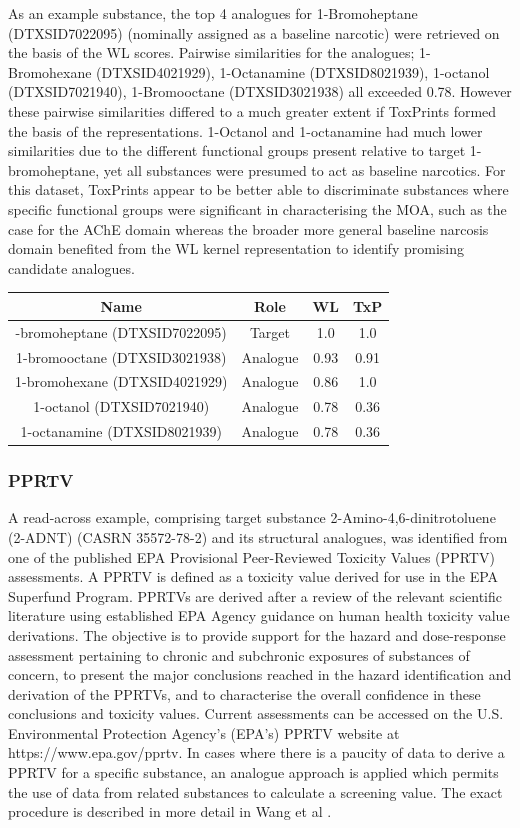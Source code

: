 \documentclass[
  super,
  preprint,
  3p]{elsarticle}
\begin{document}
As an example substance, the top 4 analogues for 1-Bromoheptane
(DTXSID7022095) (nominally assigned as a baseline narcotic) were
retrieved on the basis of the WL scores. Pairwise similarities for the
analogues; 1-Bromohexane (DTXSID4021929), 1-Octanamine (DTXSID8021939),
1-octanol (DTXSID7021940), 1-Bromooctane (DTXSID3021938) all exceeded
0.78. However these pairwise similarities differed to a much greater
extent if ToxPrints formed the basis of the representations. 1-Octanol
and 1-octanamine had much lower similarities due to the different
functional groups present relative to target 1-bromoheptane, yet all
substances were presumed to act as baseline narcotics. For this dataset,
ToxPrints appear to be better able to discriminate substances where
specific functional groups were significant in characterising the MOA,
such as the case for the AChE domain whereas the broader more general
baseline narcosis domain benefited from the WL kernel representation to
identify promising candidate analogues.

\begin{longtable}[]{@{}cccc@{}}
\toprule\noalign{}
Name & Role & WL & TxP \\
\midrule\noalign{}
\endhead
\bottomrule\noalign{}
\endlastfoot
1-bromoheptane (DTXSID7022095) & Target & 1.0 & 1.0 \\
1-bromooctane (DTXSID3021938) & Analogue & 0.93 & 0.91 \\
1-bromohexane (DTXSID4021929) & Analogue & 0.86 & 1.0 \\
1-octanol (DTXSID7021940) & Analogue & 0.78 & 0.36 \\
1-octanamine (DTXSID8021939) & Analogue & 0.78 & 0.36 \\
\end{longtable}

\subsubsection{PPRTV}\label{pprtv}

A read-across example, comprising target substance
2-Amino-4,6-dinitrotoluene (2-ADNT) (CASRN 35572-78-2) and its
structural analogues, was identified from one of the published EPA
Provisional Peer-Reviewed Toxicity Values (PPRTV) assessments. A PPRTV
is defined as a toxicity value derived for use in the EPA Superfund
Program. PPRTVs are derived after a review of the relevant scientific
literature using established EPA Agency guidance on human health
toxicity value derivations. The objective is to provide support for the
hazard and dose-response assessment pertaining to chronic and subchronic
exposures of substances of concern, to present the major conclusions
reached in the hazard identification and derivation of the PPRTVs, and
to characterise the overall confidence in these conclusions and toxicity
values. Current assessments can be accessed on the U.S. Environmental
Protection Agency's (EPA's) PPRTV website at https://www.epa.gov/pprtv.
In cases where there is a paucity of data to derive a PPRTV for a
specific substance, an analogue approach is applied which permits the
use of data from related substances to calculate a screening value. The
exact procedure is described in more detail in Wang et al
\citep{wang_application_2012}.
\end{document}
